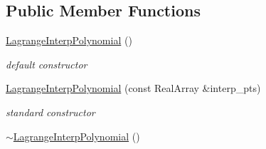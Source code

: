 \subsection*{Public Member Functions}
\begin{DoxyCompactItemize}
\item 
\hyperlink{classPecos_1_1LagrangeInterpPolynomial_aeb93b2977cfd4d359ecb67c64e2e6800}{Lagrange\+Interp\+Polynomial} ()\label{classPecos_1_1LagrangeInterpPolynomial_aeb93b2977cfd4d359ecb67c64e2e6800}

\begin{DoxyCompactList}\small\item\em default constructor \end{DoxyCompactList}\item 
\hyperlink{classPecos_1_1LagrangeInterpPolynomial_ad045b5254012df8ad6fb5dc8087d6b4c}{Lagrange\+Interp\+Polynomial} (const Real\+Array \&interp\+\_\+pts)\label{classPecos_1_1LagrangeInterpPolynomial_ad045b5254012df8ad6fb5dc8087d6b4c}

\begin{DoxyCompactList}\small\item\em standard constructor \end{DoxyCompactList}\item 
\hyperlink{classPecos_1_1LagrangeInterpPolynomial_a0409bc4b474c957cca221c01b72e1f73}{$\sim$\+Lagrange\+Interp\+Polynomial} ()\label{classPecos_1_1LagrangeInterpPolynomial_a0409bc4b474c957cca221c01b72e1f73}


\end{DoxyCompactItemize}

